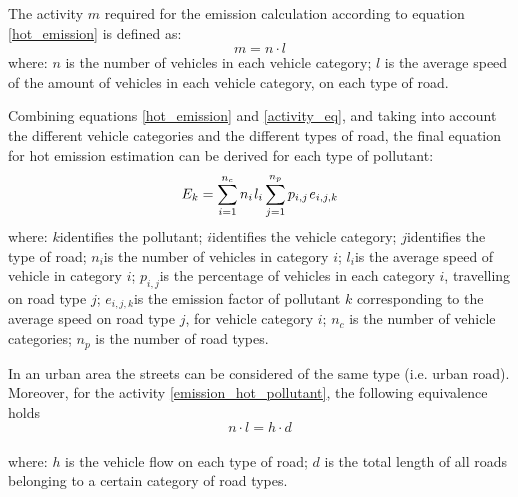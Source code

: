 \documentclass[journal]{IEEEtran}
\newcommand{\be}{\begin{equation}}
\newcommand{\ee}{\end{equation}}
\begin{document}
The activity $m$ required for the emission calculation according to equation \eqref{hot_emission} is defined as:
\begin{equation} \label{activity_eq}
m = n\cdot l
\end{equation}
where:
$n$ is the number of vehicles in each vehicle category;
 $l$ is the average speed of the amount of vehicles in each vehicle category, on each type of road.

Combining equations \eqref{hot_emission} and \eqref{activity_eq}, and taking into account the different vehicle
categories and the different types of road, the final equation for hot emission estimation can be derived for each type of pollutant:
\begin{equation} \label{emission_hot_pollutant}
E_k = \sum\limits_{i=1}^{n_c} n_i\hspace{0.3mm} l_i \sum\limits_{j=1}^{n_p} p_{i,j}\hspace{0.3mm} e_{i,j,k}
\end{equation}
where:
 $k$\hspace{0.8mm}identifies the pollutant;
 $i$\hspace{0.8mm}identifies the vehicle category;
 $j$\hspace{0.8mm}identifies the type of road;
 $n_i$\hspace{0.8mm}is the number of vehicles in category $i$;
 $l_i$\hspace{0.8mm}is the average speed of vehicle in category $i$;
 $p_{i,j}$\hspace{0.8mm}is the percentage of vehicles in each category $i$, travelling on road type $j$;
$e_{i,j,k}$\hspace{0.8mm}is the emission factor of pollutant $k$ corresponding to the average speed on road type $j$, for vehicle category $i$;
 $n_c$ is the number of vehicle categories;
 $n_p$ is the number of road types.



In an urban area the streets can be considered of the same type (i.e. urban road). Moreover, for the activity \eqref{emission_hot_pollutant}, the following equivalence holds
\be
n\cdot l = h \cdot d
\ee \\
where: 
$h$ is the vehicle flow on each type of road;
$d$ is the total length of all roads belonging to a certain category of road types. 
\end{document}
